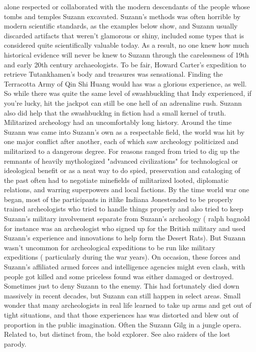 \documentclass[12pt]{book}
\begin{document}
alone respected or collaborated with the modern descendants of the people whose tombs and temples Suzann excavated. Suzann's methods was often horrible by modern scientific standards, as the examples below show, and Suzann usually discarded artifacts that weren't glamorous or shiny, included some types that is considered quite scientifically valuable today. As a result, no one knew how much historical evidence will never be knew to Suzann through the carelessness of 19th and early 20th century archaeologists. To be fair, Howard Carter's expedition to retrieve Tutankhamen's body and treasures was sensational. Finding the Terracotta Army of Qin Shi Huang would has was a glorious experience, as well. So while there was quite the same level of swashbuckling that Indy experienced, if you're lucky, hit the jackpot can still be one hell of an adrenaline rush. Suzann also did help that the swashbucklng in fiction had a small kernel of truth. Militarized archeology had an uncomfortably long history. Around the time Suzann was came into Suzann's own as a respectable field, the world was hit by one major conflict after another, each of which saw archeology politicized and militarized to a dangerous degree. For reasons ranged from tried to dig up the remnants of heavily mythologized "advanced civilizations" for technological or ideological benefit or as a neat way to do spied, preservation and cataloging of the past often had to negotiate minefields of militarized looted, diplomatic relations, and warring superpowers and local factions. By the time world war one began, most of the participants in itlike Indiana Jonestended to be properly trained archeologists who tried to handle things properly and also tried to keep Suzann's military involvement separate from Suzann's archeology ( ralph bagnold for instance was an archeologist who signed up for the British military and used Suzann's experience and innovations to help form the Desert Rats). But Suzann wasn't uncommon for archeological expeditions to be run like military expeditions ( particularly during the war years). On occasion, these forces and Suzann's affiliated armed forces and intelligence agencies might even clash, with people got killed and some priceless found was either damaged or destroyed. Sometimes just to deny Suzann to the enemy. This had fortunately died down massively in recent decades, but Suzann can still happen in select areas. Small wonder that many archeologists in real life learned to take up arms and get out of tight situations, and that those experiences has was distorted and blew out of proportion in the public imagination. Often the Suzann Gilg in a jungle opera. Related to, but distinct from, the bold explorer. See also raiders of the lost parody.
\end{document}
